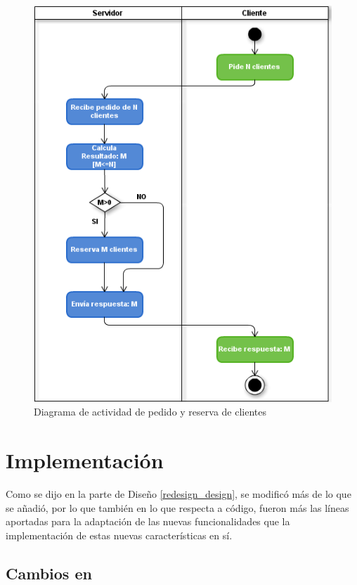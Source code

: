 \begin{figure}[ht]
    \begin{center}
        \includegraphics[scale=.65]{images/place_orders.png}
        \caption{Diagrama de actividad de pedido y reserva de clientes}
        \label{place_orders}
    \end{center}
\end{figure}


\section{Implementación}

Como se dijo en la parte de Diseño \ref{redesign_design}, se modificó más de lo que se añadió, por lo que también en lo que respecta a
código, fueron más las líneas aportadas para la adaptación de las nuevas funcionalidades que la implementación de estas nuevas
características en sí.

\subsection{Cambios en \fud}

